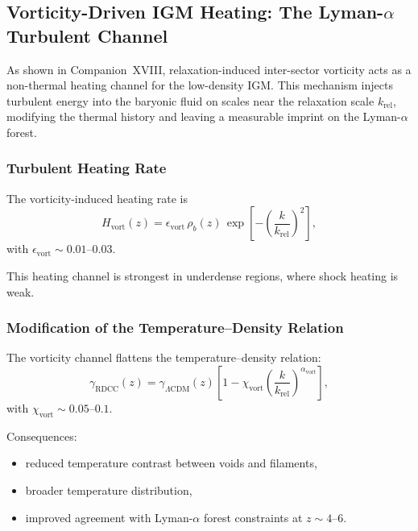 \documentclass[11pt,a4paper]{article}
\begin{document}
\subsection[Vorticity-Driven IGM Heating: The Lyman-alpha Turbulent Channel]
{Vorticity-Driven IGM Heating: The Lyman-$\alpha$ Turbulent Channel}

As shown in Companion~XVIII, relaxation-induced inter-sector vorticity acts as a non-thermal
heating channel for the low-density IGM. This mechanism injects turbulent energy into the
baryonic fluid on scales near the relaxation scale $k_{\mathrm{rel}}$, modifying the thermal history
and leaving a measurable imprint on the Lyman-$\alpha$ forest.

\subsubsection{Turbulent Heating Rate}

The vorticity-induced heating rate is
\begin{equation}
H_{\mathrm{vort}}(z)
=
\epsilon_{\mathrm{vort}}\,
\rho_{b}(z)\,
\exp\!\left[
-
\left(
\frac{k}{k_{\mathrm{rel}}}
\right)^{2}
\right],
\end{equation}
with $\epsilon_{\mathrm{vort}} \sim 0.01$–$0.03$.

This heating channel is strongest in underdense regions, where shock heating is weak.

\subsubsection{Modification of the Temperature–Density Relation}

The vorticity channel flattens the temperature–density relation:
\begin{equation}
\gamma_{\mathrm{RDCC}}(z)
=
\gamma_{\Lambda\mathrm{CDM}}(z)
\left[
1
-
\chi_{\mathrm{vort}}
\left(
\frac{k}{k_{\mathrm{rel}}}
\right)^{\alpha_{\mathrm{vort}}}
\right],
\end{equation}
with $\chi_{\mathrm{vort}} \sim 0.05$–$0.1$.

Consequences:
\begin{itemize}
\item reduced temperature contrast between voids and filaments,
\item broader temperature distribution,
\item improved agreement with Lyman-$\alpha$ forest constraints at $z \sim 4$–$6$.
\end{itemize}
\end{document}
